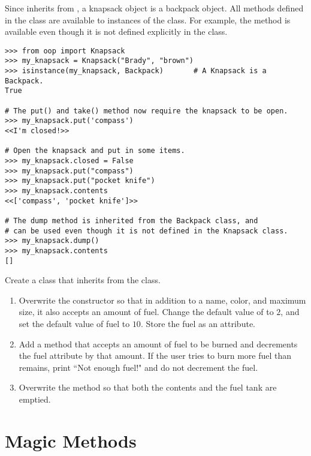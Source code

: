 Since  inherits from , a knapsack object is a backpack object.
All methods defined in the  class are available to instances of the  class.
For example, the  method is available even though it is not defined explicitly in the  class.

\begin{lstlisting}
>>> from oop import Knapsack
>>> my_knapsack = Knapsack("Brady", "brown")
>>> isinstance(my_knapsack, Backpack)       # A Knapsack is a Backpack.
True

# The put() and take() method now require the knapsack to be open.
>>> my_knapsack.put('compass')
<<I'm closed!>>

# Open the knapsack and put in some items.
>>> my_knapsack.closed = False
>>> my_knapsack.put("compass")
>>> my_knapsack.put("pocket knife")
>>> my_knapsack.contents
<<['compass', 'pocket knife']>>

# The dump method is inherited from the Backpack class, and
# can be used even though it is not defined in the Knapsack class.
>>> my_knapsack.dump()
>>> my_knapsack.contents
[]
\end{lstlisting}

\begin{problem} %
Create a  class that inherits from the  class.
\begin{enumerate}
\item Overwrite the constructor so that in addition to a name, color, and maximum size, it also accepts an amount of fuel.
Change the default value of  to $2$, and set the default value of fuel to $10$.
Store the fuel as an attribute.

\item Add a  method that accepts an amount of fuel to be burned and decrements the fuel attribute by that amount.
If the user tries to burn more fuel than remains, print ``Not enough fuel!" and do not decrement the fuel.

\item Overwrite the  method so that both the contents and the fuel tank are emptied.
\end{enumerate}
\end{problem}

\section*{Magic Methods} %

